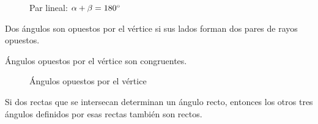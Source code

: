 \begin{figure}[!h]
    \centering
    
    \caption{Par lineal: $\alpha + \beta = 180^{\circ}$}
    \label{fig:par-lineal}
\end{figure}    

\begin{definition}
    Dos ángulos son opuestos por el vértice si sus lados forman dos pares de rayos opuestos.
\end{definition}

\begin{theorem}
    Ángulos opuestos por el vértice son congruentes.

    \begin{figure}[!h]
        \centering
        
        \caption{Ángulos opuestos por el vértice}
        \label{fig:ang-opuestos}
    \end{figure}
    
\end{theorem}

\begin{theorem}
    Si dos rectas que se intersecan determinan un ángulo recto, entonces los otros tres ángulos definidos por esas rectas también son rectos.
\end{theorem}



